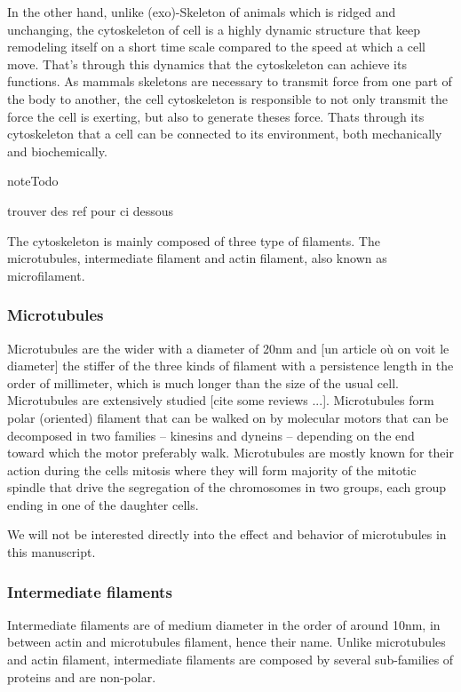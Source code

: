 \documentclass[A4paperpaper,11pt,english]{sphinxmanual}
\begin{document}
In the other hand, unlike (exo)-Skeleton of animals which is ridged and
unchanging, the cytoskeleton of cell is a  highly dynamic structure that keep
remodeling itself on a short time scale compared to the speed at which a cell
move. That's through this dynamics that the cytoskeleton can achieve its
functions.  As mammals skeletons are necessary to transmit force from one part
of the body to another, the cell cytoskeleton is responsible to not only
transmit the force the cell is exerting, but also to generate theses force.
Thats through its cytoskeleton that a cell can be connected to its environment,
both mechanically and biochemically.

\begin{notice}{note}{Todo}

trouver des ref pour ci dessous
\end{notice}

The cytoskeleton is mainly composed of three type of filaments.  The
microtubules, intermediate filament and actin filament, also known as
microfilament.


\subsubsection{Microtubules}
\label{parts/part1:microtubules}
Microtubules are the wider with a diameter of 20nm and {[}un article où on voit le diameter{]} the stiffer of the three kinds of filament with a persistence
length in the order of millimeter, which is much longer than the size of the
usual cell. Microtubules are extensively studied {[}cite some reviews ...{]}.
Microtubules form polar (oriented) filament that can be walked on by molecular
motors that can be decomposed in two families – kinesins  and dyneins –
depending on the end toward which the motor preferably walk. Microtubules are
mostly known for their action during the cells mitosis where they will form
majority of the mitotic spindle that drive the segregation of the chromosomes
in two groups, each group ending in one of the daughter cells.

We will not be interested directly into the effect and behavior of microtubules
in this manuscript.


\subsubsection{Intermediate filaments}
\label{parts/part1:intermediate-filaments}
Intermediate filaments are of medium diameter in the order of around 10nm, in
between actin and microtubules filament, hence their name.  Unlike microtubules
and actin filament, intermediate filaments are composed by several sub-families
of proteins and are non-polar.
\end{document}
